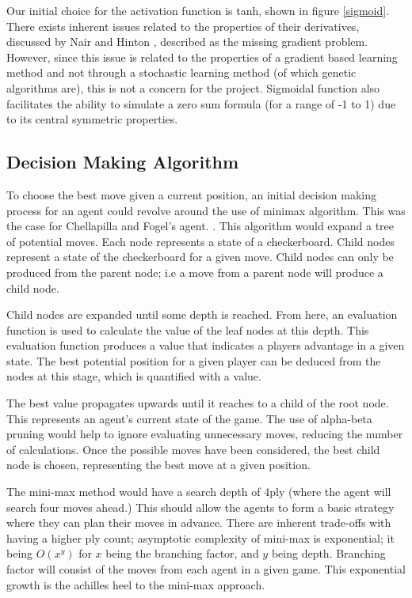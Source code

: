 \documentclass[12pt,a4paper]{article}
\begin{document}
        Our initial choice for the activation function is tanh, shown in figure \ref{sigmoid}. There exists inherent issues related to the properties of their derivatives, discussed by Nair and Hinton \cite{nair_rectified_2010}, described as the missing gradient problem. However, since this issue is related to the properties of a gradient based learning method and not through a stochastic learning method (of which genetic algorithms are), this is not a concern for the project. Sigmoidal function also facilitates the ability to simulate a zero sum formula (for a range of -1 to 1) due to its central symmetric properties.
        
    \subsection{Decision Making Algorithm}

        To choose the best move given a current position, an initial decision making process for an agent could revolve around the use of minimax algorithm. This was the case for Chellapilla and Fogel's agent. \cite{chellapilla_evolving_1999}. This algorithm would expand a tree of potential moves. Each node represents a state of a checkerboard. Child nodes represent a state of the checkerboard for a given move. Child nodes can only be produced from the parent node; i.e a move from a parent node will produce a child node. 
        
        Child nodes are expanded until some depth is reached. From here, an evaluation function is used to calculate the value of the leaf nodes at this depth. This evaluation function produces a value that indicates a players advantage in a given state. The best potential position for a given player can be deduced from the nodes at this stage, which is quantified with a value.

        The best value propagates upwards until it reaches to a child of the root node. This represents an agent's current state of the game. The use of alpha-beta pruning would help to ignore evaluating unnecessary moves, reducing the number of calculations. Once the possible moves have been considered, the best child node is chosen, representing the best move at a given position.

        The mini-max method would have a search depth of 4ply (where the agent will search four moves ahead.) This should allow the agents to form a basic strategy where they can plan their moves in advance. There are inherent trade-offs with having a higher ply count; asymptotic complexity of mini-max is exponential; it being $O(x^y)$ for $x$ being the branching factor, and $y$ being depth. Branching factor will consist of the moves from each agent in a given game. This exponential growth is the achilles heel to the mini-max approach.
\end{document}
